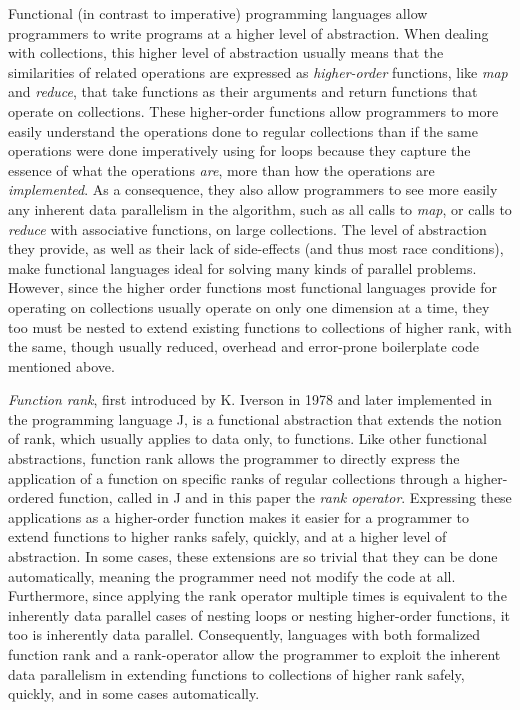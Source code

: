 Functional (in contrast to imperative) programming languages 
allow programmers to write programs at a higher level of abstraction.
When dealing with collections, 
this higher level of abstraction usually means that the similarities of related operations 
are expressed as \textit{higher-order} functions, like \textit{map} and \textit{reduce}, 
that take functions as their arguments and return functions that operate on collections.
These higher-order functions allow programmers to more easily understand the operations done to regular collections 
than if the same operations were done imperatively using for loops 
because they capture the essence of what the operations \textit{are}, more than how the operations are \textit{implemented}.
As a consequence, they also allow programmers 
to see more easily any inherent data parallelism in the algorithm, 
such as all calls to \textit{map}, or calls to \textit{reduce} with associative functions, on large collections. 
The level of abstraction they provide, 
as well as their lack of side-effects (and thus most race conditions), 
make functional languages ideal for solving many kinds of parallel problems.
However, since the higher order functions most functional languages provide for operating on collections 
usually operate on only one dimension at a time, 
they too must be nested to extend existing functions to collections of higher rank, 
with the same, though usually reduced, overhead and error-prone boilerplate code mentioned above.

\textit{Function rank}, first introduced by K. Iverson in 1978\cite{opandfunc} 
and later implemented in the programming language J, 
is a functional abstraction that extends the notion of rank, which usually applies to data only, to functions. 
Like other functional abstractions, 
function rank allows the programmer to directly express 
the application of a function on specific ranks of regular collections 
through a higher-ordered function, called in J and in this paper the \textit{rank operator}\cite{jvocab}.
Expressing these applications as a higher-order function 
makes it easier for a programmer to extend functions to higher ranks safely, quickly, and at a higher level of abstraction.
In some cases, these extensions are so trivial that they can be done automatically, 
meaning the programmer need not modify the code at all\cite{jvocab}\cite{rankanduni}. 
Furthermore, since applying the rank operator multiple times 
is equivalent to the inherently data parallel cases of nesting loops or nesting higher-order functions, 
it too is inherently data parallel.
Consequently, languages with both formalized function rank and a rank-operator 
allow the programmer to exploit the inherent data parallelism in extending functions to collections of higher rank 
safely, quickly, and in some cases automatically.

